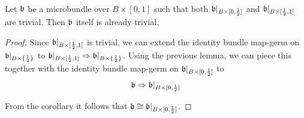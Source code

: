 \begin{file}
\newcommand{\bbleft} {
    \bb\restrict{B \times{} [0, \half]}
}
\newcommand{\bbright} {
    \bb\restrict{B \times{} [\half, 1]}
}
\newcommand{\bbhalf} {
    \bb\restrict{B \times{} \{ \half \}}
}

 \\
Let $\mathfrak{b}$ be a microbundle over $B \times [0, 1]$ such that both $\bbleft$ and $\bbright$ are trivial.
Then $\mathfrak{b}$ itself is already trivial.
\begin{proof}
Since $\bbright$ is trivial, we can extend the identity bundle map-germ on $\bbhalf$ to $\bbright \double \bbhalf$.
Using the previous lemma, we can piece this together with the identity bundle map-germ on $\bbleft$ to
\[ \bb \double \bbleft \]

From the corollary it follows that $\bb \cong \bbleft$.
\end{proof}

\end{file}